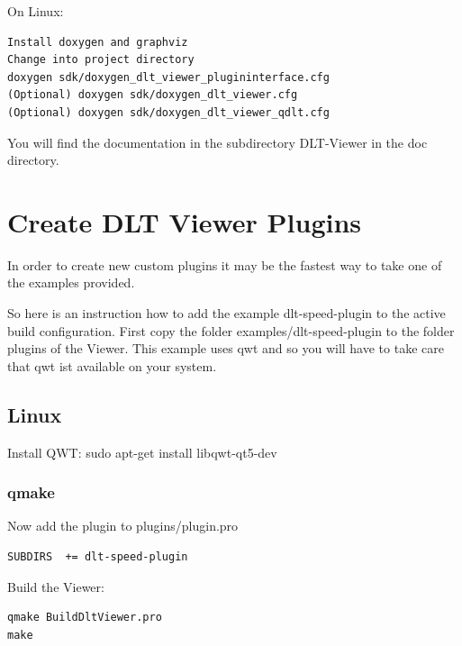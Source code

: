 \documentclass[a4paper,11pt]{article}
\begin{document}
On Linux:

\begin{verbatim}
Install doxygen and graphviz
Change into project directory
doxygen sdk/doxygen_dlt_viewer_plugininterface.cfg
(Optional) doxygen sdk/doxygen_dlt_viewer.cfg
(Optional) doxygen sdk/doxygen_dlt_viewer_qdlt.cfg
\end{verbatim}
You will find the documentation in the subdirectory DLT-Viewer in the doc directory.


\pagebreak

\section{Create DLT Viewer Plugins}

In order to create new custom plugins it may be the fastest way to take one of the examples provided.

So here is an instruction how to add the example dlt-speed-plugin to the active build configuration.
First copy the folder examples/dlt-speed-plugin to the folder plugins of the Viewer.
This example uses qwt and so you will have to take care that qwt ist available on your system.


\subsection{Linux}

Install QWT: sudo apt-get install libqwt-qt5-dev

\subsubsection{qmake}

Now add the plugin to plugins/plugin.pro

\begin{verbatim}
SUBDIRS  += dlt-speed-plugin
\end{verbatim}

Build the Viewer:
\begin{verbatim}
qmake BuildDltViewer.pro
make
\end{verbatim}
\end{document}
